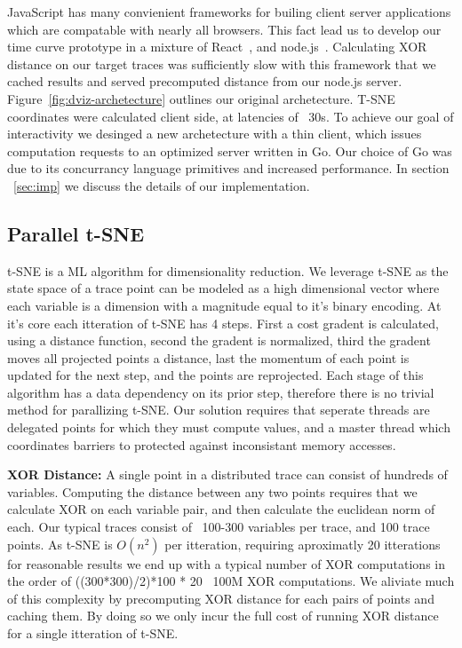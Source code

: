 JavaScript has many convienient frameworks for builing client server
applications which are compatable with nearly all browsers. This fact lead us
to develop our time curve prototype in a mixture of React~\cite{react}, and
node.js~\cite{node.js}. Calculating XOR distance on our target traces was
sufficiently slow with this framework that we cached results and served
precomputed distance from our node.js server. Figure~\ref{fig:dviz-archetecture} outlines our original archetecture. T-SNE coordinates
were calculated client side, at latencies of ~30s. To achieve our goal of
interactivity we desinged a new archetecture with a thin client, which issues
computation requests to an optimized server written in Go. Our choice of Go was
due to its concurrancy language primitives and increased performance. In
section ~\ref{sec:imp} we discuss the details of our implementation.

\subsection{Parallel t-SNE}
\label{sec:ptsne}
t-SNE is a ML algorithm for dimensionality reduction. We leverage t-SNE as the
state space of a trace point can be modeled as a high dimensional vector where
each variable is a dimension with a magnitude equal to it's binary encoding. At
it's core each itteration of t-SNE has 4 steps. First a cost gradent is
calculated, using a distance function, second the gradent is normalized, third
the gradent moves all projected points a distance, last the momentum of each
point is updated for the next step, and the points are reprojected. Each stage
of this algorithm has a data dependency on its prior step, therefore there is
no trivial method for parallizing t-SNE. Our solution requires that seperate
threads are delegated points for which they must compute values, and a master
thread which coordinates barriers to protected against inconsistant memory
accesses.



\noindent\textbf{XOR Distance:} A single point in a distributed trace can
consist of hundreds of variables.  Computing the distance between any
two points requires that we calculate XOR on each variable pair, and
then calculate the euclidean norm of each. Our typical traces consist
of ~100-300 variables per trace, and 100 trace points. As t-SNE is
$O(n^2)$ per itteration, requiring aproximatly 20 itterations for
reasonable results we end up with a typical number of XOR computations
in the order of ((300*300)/2)*100 * 20 ~100M XOR computations. We
aliviate much of this complexity by precomputing XOR distance for each
pairs of points and caching them. By doing so we only incur the full
cost of running XOR distance for a single itteration of t-SNE.


